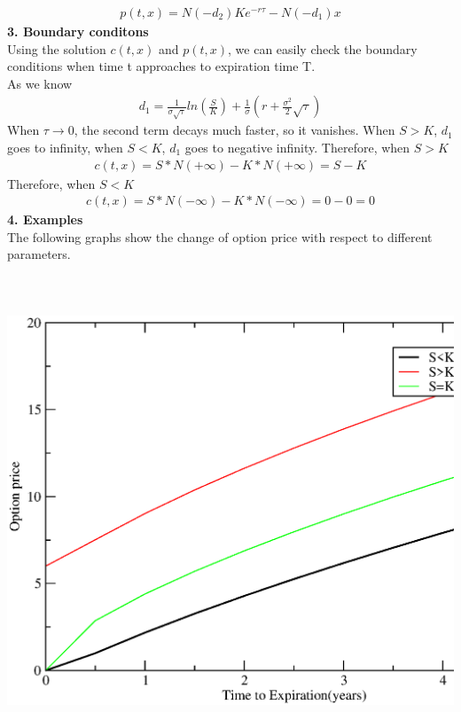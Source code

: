 \documentclass[a4paper]{article}
\begin{document}
\begin{align*}
	p(t,x) = N(-d_2)Ke^{-r\tau} -N(-d_1)x
\end{align*}
{\bf 3. Boundary conditons}\\
Using the solution $c(t,x)$ and $p(t,x)$, we can easily check the boundary conditions when
time t approaches to expiration time T.\\
As we know
\begin{align*}
	d_1 = \frac{1}{\sigma \sqrt{\tau}}ln(\frac{S}{K}) 
	+ \frac{1}{\sigma}(r+\frac{\sigma^2}{2}\sqrt{\tau})
\end{align*}
When $\tau \to 0$, the second term decays much faster, so it vanishes. When $S>K$, $d_1$ goes to infinity, when $S<K$, $d_1$ goes to negative infinity.
Therefore, when $S>K$
\begin{align*}
	c(t,x) = S*N(+\infty) - K*N(+\infty) = S-K
\end{align*}
Therefore, when $S<K$
\begin{align*}
	c(t,x) = S*N(-\infty) - K*N(-\infty) = 0-0 = 0
\end{align*}
{\bf 4. Examples}\\
The following graphs show the change of option price with respect to different parameters.
\\
\\
\\
\\
\includegraphics[scale = 0.5]{option_price1.eps}\\
\end{document}
